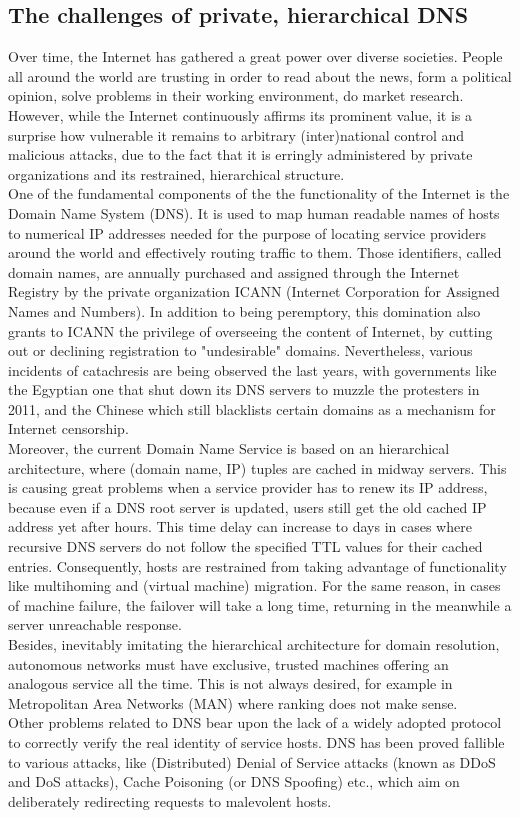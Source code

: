 \documentclass[12pt,a4paper,oneside]{article}
\begin{document}
\newpage
\subsection{The challenges of private, hierarchical DNS}
Over time, the Internet has gathered a great power over diverse societies. People all around the world are trusting in order to read about the news, form a political opinion, solve problems in their working environment, do market research. However, while the Internet continuously affirms its prominent value, it is a surprise how vulnerable it remains to arbitrary (inter)national control and malicious attacks, due to the fact that it is erringly administered by private organizations and its restrained, hierarchical structure. \\
\indent One of the fundamental components of the the functionality of the Internet is the Domain Name System (DNS). It is used to map human readable names of hosts to numerical IP addresses needed for the purpose of locating service providers around the world and effectively routing traffic to them. Those identifiers, called domain names, are annually purchased and assigned through the Internet Registry by the private organization ICANN (Internet Corporation for Assigned Names and Numbers). In addition to being peremptory, this domination also grants to ICANN the privilege of overseeing the content of Internet, by cutting out or declining registration to "undesirable" domains. Nevertheless, various incidents of catachresis are being observed the last years, with governments like the Egyptian one that shut down its DNS servers to muzzle the protesters in 2011, and the Chinese which still blacklists certain domains as a mechanism for Internet censorship.\\
\indent Moreover, the current Domain Name Service is based on an hierarchical architecture, where (domain name, IP) tuples are cached in midway servers. This is causing great problems when a service provider has to renew its IP address, because even if a DNS root server is updated, users still get the old cached IP address yet after hours. This time delay can increase to days in cases where recursive DNS servers do not follow the specified TTL values for their cached entries. Consequently, hosts are restrained from taking advantage of functionality like multihoming and (virtual machine) migration. For the same reason, in cases of machine failure, the failover will take a long time, returning in the meanwhile a server unreachable response. \\
\indent Besides, inevitably imitating the hierarchical architecture for domain resolution, autonomous networks must have exclusive, trusted machines offering an analogous service all the time. This is not always desired, for example in Metropolitan Area Networks (MAN) where ranking does not make sense.\\
\indent Other problems related to DNS bear upon the lack of a widely adopted protocol to correctly verify the real identity of service hosts. DNS has been proved fallible to various attacks, like (Distributed) Denial of Service attacks (known as DDoS and DoS attacks), Cache Poisoning (or DNS Spoofing) etc., which aim on deliberately redirecting requests to malevolent hosts.
\end{document}
